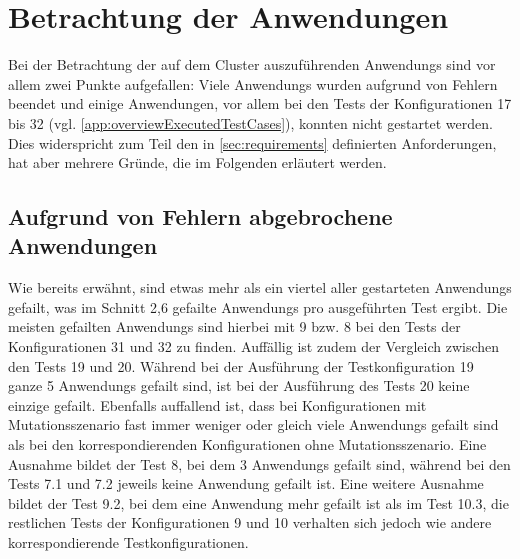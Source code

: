 \section{Betrachtung der Anwendungen}
\label{sec:appEval}

Bei der Betrachtung der auf dem Cluster auszuführenden \glspl{Anwendung} sind vor allem zwei Punkte aufgefallen:
Viele \glspl{Anwendung} wurden aufgrund von Fehlern beendet und einige Anwendungen, vor allem bei den \glspl{Test} der Konfigurationen 17 bis 32 (vgl. \cref{app:overviewExecutedTestCases}), konnten nicht gestartet werden.
Dies widerspricht zum Teil den in \cref{sec:requirements} definierten Anforderungen, hat aber mehrere Gründe, die im Folgenden erläutert werden.

\subsection{Aufgrund von Fehlern abgebrochene Anwendungen}
\label{subsec:failedApps}

Wie bereits erwähnt, sind etwas mehr als ein viertel aller gestarteten \glspl{Anwendung} gefailt, was im Schnitt 2,6 gefailte \glspl{Anwendung} pro ausgeführten \gls{Test} ergibt.
Die meisten gefailten \glspl{Anwendung} sind hierbei mit 9 bzw. 8 bei den \glspl{Test} der Konfigurationen 31 und 32 zu finden.
Auffällig ist zudem der Vergleich zwischen den \glspl{Test} 19 und 20.
Während bei der Ausführung der \gls{Testkonfiguration} 19 ganze 5 \glspl{Anwendung} gefailt sind, ist bei der Ausführung des \glspl{Test} 20 keine einzige gefailt.
Ebenfalls auffallend ist, dass bei Konfigurationen mit Mutationsszenario fast immer weniger oder gleich viele \glspl{Anwendung} gefailt sind als bei den korrespondierenden Konfigurationen ohne Mutationsszenario.
Eine Ausnahme bildet der \gls{Test} 8, bei dem 3 \glspl{Anwendung} gefailt sind, während bei den \glspl{Test} 7.1 und 7.2 jeweils keine \gls{Anwendung} gefailt ist.
Eine weitere Ausnahme bildet der \gls{Test} 9.2, bei dem eine \gls{Anwendung} mehr gefailt ist als im \gls{Test} 10.3, die restlichen \glspl{Test} der Konfigurationen 9 und 10 verhalten sich jedoch wie andere korrespondierende Testkonfigurationen.

